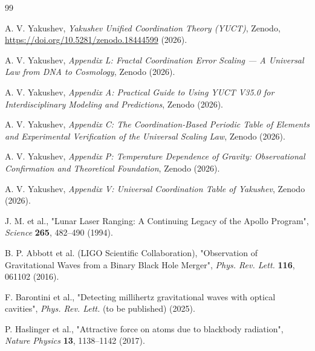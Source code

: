 \documentclass[12pt,a4paper]{article}
\begin{document}
	\begin{thebibliography}{99}
		
		A. V. Yakushev, \emph{Yakushev Unified Coordination Theory (YUCT)}, Zenodo, \url{https://doi.org/10.5281/zenodo.18444599} (2026).
		
		A. V. Yakushev, \emph{Appendix L: Fractal Coordination Error Scaling — A Universal Law from DNA to Cosmology}, Zenodo (2026).
		
		A. V. Yakushev, \emph{Appendix A: Practical Guide to Using YUCT V35.0 for Interdisciplinary Modeling and Predictions}, Zenodo (2026).
		
		A. V. Yakushev, \emph{Appendix C: The Coordination‑Based Periodic Table of Elements and Experimental Verification of the Universal Scaling Law}, Zenodo (2026).
		
		A. V. Yakushev, \emph{Appendix P: Temperature Dependence of Gravity: Observational Confirmation and Theoretical Foundation}, Zenodo (2026).
		
		A. V. Yakushev, \emph{Appendix V: Universal Coordination Table of Yakushev}, Zenodo (2026).
		
		J. M. et al., "Lunar Laser Ranging: A Continuing Legacy of the Apollo Program", \emph{Science} \textbf{265}, 482–490 (1994).
		
		B. P. Abbott et al. (LIGO Scientific Collaboration), "Observation of Gravitational Waves from a Binary Black Hole Merger", \emph{Phys. Rev. Lett.} \textbf{116}, 061102 (2016).
		
		F. Barontini et al., "Detecting millihertz gravitational waves with optical cavities", \emph{Phys. Rev. Lett.} (to be published) (2025).
		
		P. Haslinger et al., "Attractive force on atoms due to blackbody radiation", \emph{Nature Physics} \textbf{13}, 1138–1142 (2017).
		
	\end{thebibliography}
	
\end{document}

